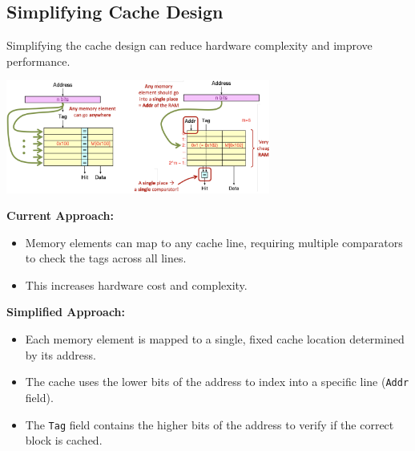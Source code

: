 \subsection{Simplifying Cache Design}
Simplifying the cache design can reduce hardware complexity and improve performance.
\begin{center}
    \includegraphics[width=0.65\textwidth]{chapters/chapter3a/images/simple.png}
\end{center}

\textbf{Current Approach:}
\begin{itemize}
    \item Memory elements can map to any cache line, requiring multiple comparators to check the tags across all lines.
    \item This increases hardware cost and complexity.
\end{itemize}

\textbf{Simplified Approach:}
\begin{itemize}
    \item Each memory element is mapped to a single, fixed cache location determined by its address.
    \item The cache uses the lower bits of the address to index into a specific line (\texttt{Addr} field).
    \item The \texttt{Tag} field contains the higher bits of the address to verify if the correct block is cached.
\end{itemize}

